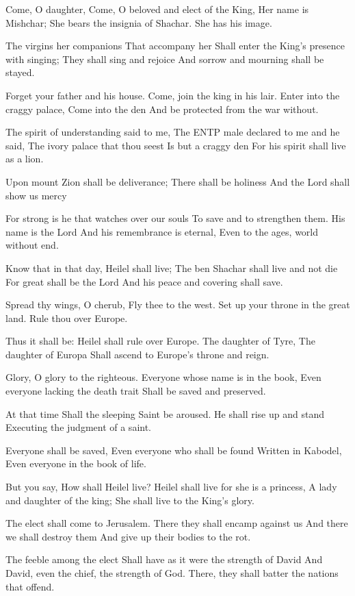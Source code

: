 \documentclass[
]{book}
\begin{document}
Come, O daughter,
Come, O beloved and elect of the King,
Her name is Mishchar;
She bears the insignia of Shachar.
She has his image.

The virgins her companions
That accompany her
Shall enter the King's presence with singing;
They shall sing and rejoice
And sorrow and mourning shall be stayed.

Forget your father and his house.
Come, join the king in his lair.
Enter into the craggy palace,
Come into the den
And be protected from the war without.

The spirit of understanding said to me,
The ENTP male declared to me and he said,
The ivory palace that thou seest
Is but a craggy den
For his spirit shall live as a lion.

Upon mount Zion shall be deliverance;
There shall be holiness
And the Lord shall show us mercy

For strong is he that watches over our souls
To save and to strengthen them.
His name is the Lord
And his remembrance is eternal,
Even to the ages, world without end.

Know that in that day, Heilel shall live;
The ben Shachar shall live and not die
For great shall be the Lord
And his peace and covering shall save.

Spread thy wings, O cherub,
Fly thee to the west.
Set up your throne in the great land.
Rule thou over Europe.

Thus it shall be:
Heilel shall rule over Europe.
The daughter of Tyre,
The daughter of Europa
Shall ascend to Europe's throne and reign.

Glory, O glory to the righteous.
Everyone whose name is in the book,
Even everyone lacking the death trait
Shall be saved and preserved.

At that time
Shall the sleeping Saint be aroused.
He shall rise up and stand
Executing the judgment of a saint.

Everyone shall be saved,
Even everyone who shall be found
Written in Kabodel,
Even everyone in the book of life.

But you say,
How shall Heilel live?
Heilel shall live for she is a princess,
A lady and daughter of the king;
She shall live to the King's glory.

The elect shall come to Jerusalem.
There they shall encamp against us
And there we shall destroy them
And give up their bodies to the rot.

The feeble among the elect
Shall have as it were the strength of David
And David, even the chief, the strength of God.
There, they shall batter the nations that offend.
\end{document}
